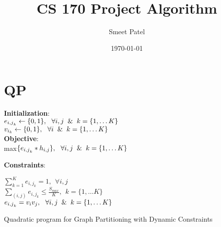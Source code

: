 \documentclass[13pt, letterpaper]{article}
\title{CS 170 Project Algorithm}
\author{Smeet Patel}
\date{\today}
\begin{document}
{\let\newpage\relax\maketitle} 
\maketitle


\section{QP}
\begin{algorithm}[H]

\SetAlgoLined
{}
 \vspace*{.1cm}
 \vspace*{.1cm}
 \textbf{Initialization}: \\
 $e_{{i,j}_k} \leftarrow \{0,1\}, \ \  \forall i,j \And k = \{1, \dots K\} $\\
 $v_{i_{k}} \leftarrow \{0,1\}, \ \ \forall i \And k = \{1, \dots K\}$\\ 
  \vspace*{.1cm}
 \textbf{Objective}: \\
 max$\{e_{{i,j}_{k}} * h_{i,j}\}, \ \ \forall i,j \And k = \{1, \dots K\}$

  \vspace*{.1cm}
 \textbf{Constraints}:

 \vspace*{.1cm}
$\sum_{k = 1}^{K} e_{{i,j}_{k}} = 1, \ \  \forall i,j $ \\
$\sum_{(i,j)} e_{{i,j}_{k}} \leq \frac{S_{max}}{K}, \ \ k = \{1, \dots K\}$\\
$e_{{i,j}_{k}} = v_{i}v_{j}, \ \ \forall i,j \And k = \{1, \dots K\}$
 \caption{Quadratic program for Graph Partitioning with Dynamic Constraints}
\end{algorithm}

 
\end{document}
